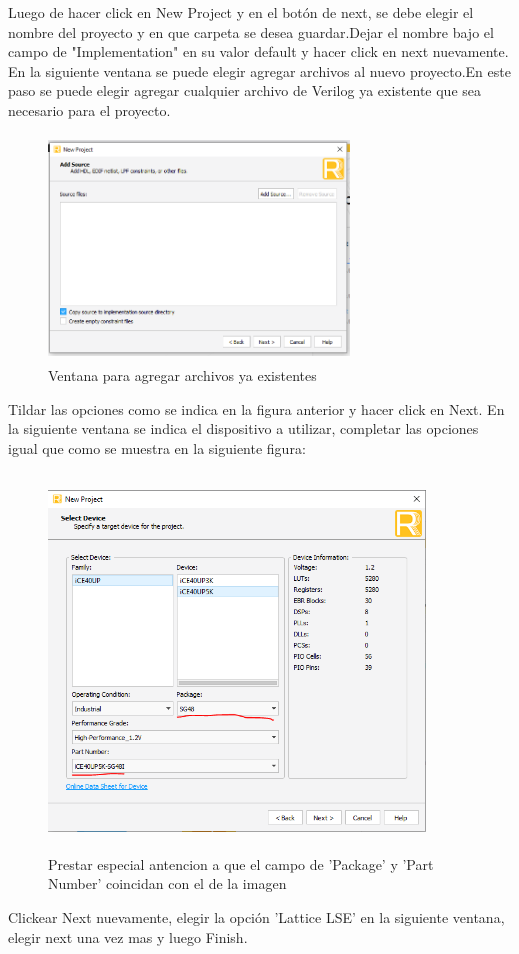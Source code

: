\documentclass{article}
\begin{document}
	Luego de hacer click en New Project y en el botón de next, se debe elegir el nombre del proyecto y en que carpeta se desea guardar.Dejar el nombre bajo el campo de "Implementation" en su valor default y hacer click en next nuevamente.
	En la siguiente ventana se puede elegir agregar archivos al nuevo proyecto.En este paso se puede elegir agregar cualquier archivo de Verilog ya existente que sea necesario para el proyecto.
	\begin{figure}[H]
	\centering
	\includegraphics[height=6cm,width=8cm]{Imagenes/AddSources.png}
	\caption{Ventana para agregar archivos ya existentes}
	\end{figure}
	
	Tildar las opciones como se indica en la figura anterior y hacer click en Next.
	En la siguiente ventana se indica el dispositivo a utilizar, completar las opciones igual que como se muestra en la siguiente figura:
	\begin{figure}[H]
	\centering
	\includegraphics[height=10cm,width=10cm]{Imagenes/Dispositivo.png}
	\caption{Prestar especial antencion a que el campo de 'Package' y 'Part Number' coincidan con el de la imagen }
	\end{figure}
	Clickear Next nuevamente, elegir la opción 'Lattice LSE' en la siguiente ventana, elegir next una vez mas y luego Finish.
	
\end{document}

